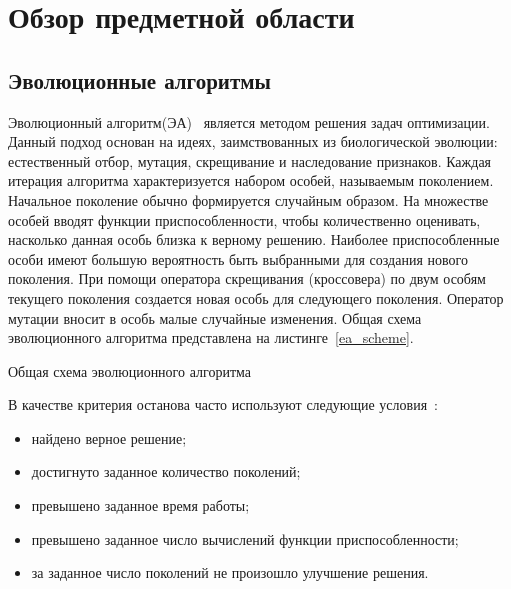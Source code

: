 \chapter{Обзор предметной области}
\label{chapter_review}

\section{Эволюционные алгоритмы}
Эволюционный алгоритм(ЭА)~\cite{skobtsov, eiben-ea} является методом решения задач оптимизации. Данный подход основан на идеях, заимствованных из биологической эволюции: естественный отбор, мутация, скрещивание и наследование признаков. Каждая итерация алгоритма характеризуется набором особей, называемым поколением. Начальное поколение обычно формируется случайным образом. На множестве особей вводят функции приспособленности, чтобы количественно оценивать, насколько данная особь близка к верному решению. Наиболее приспособленные особи имеют большую вероятность быть выбранными для создания нового поколения. При помощи оператора скрещивания (кроссовера) по двум особям текущего поколения создается новая особь для следующего поколения. Оператор мутации вносит в особь малые случайные изменения. Общая схема эволюционного алгоритма представлена на листинге~\ref{ea_scheme}.

\begin{algorithm}[h!]
\caption{Общая схема эволюционного алгоритма}
\label{ea_scheme}
\begin{algorithmic}[1]
  \ENDWHILE  
\end{algorithmic}
\end{algorithm}

В качестве критерия останова часто используют следующие условия~\cite{mitchell-ga}:
\begin{itemize}
 \item найдено верное решение;
 \item достигнуто заданное количество поколений;
 \item превышено заданное время работы;
 \item превышено заданное число вычислений функции приспособленности;
 \item за заданное число поколений не произошло улучшение решения.
\end{itemize}

